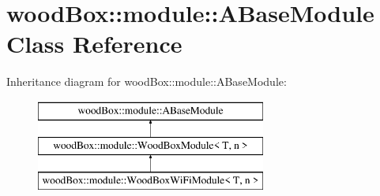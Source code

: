 \hypertarget{classwood_box_1_1module_1_1_a_base_module}{}\section{wood\+Box\+:\+:module\+:\+:A\+Base\+Module Class Reference}
\label{classwood_box_1_1module_1_1_a_base_module}
Inheritance diagram for wood\+Box\+:\+:module\+:\+:A\+Base\+Module\+:\begin{figure}[H]
\begin{center}
\leavevmode
\includegraphics[height=3.000000cm]{classwood_box_1_1module_1_1_a_base_module}
\end{center}
\end{figure}
